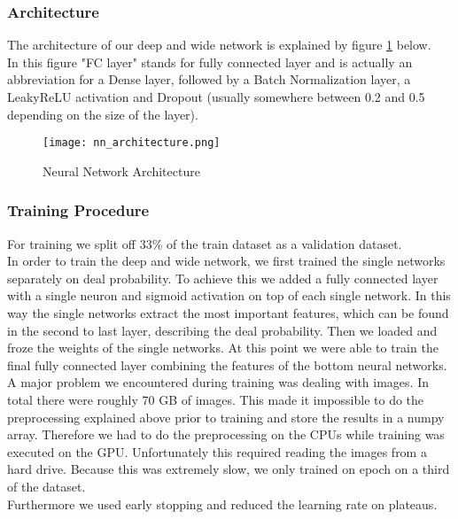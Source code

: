 \documentclass[runningheads]{llncs}
\begin{document}
 \subsubsection{Architecture}
The architecture of our deep and wide network is explained by figure \ref{fig:architecture} below.\\
In this figure "FC layer" stands for fully connected layer and is actually an abbreviation for a Dense layer, followed by a Batch Normalization layer, a LeakyReLU activation and Dropout (usually somewhere between 0.2 and 0.5 depending on the size of the layer).
 
\begin{figure}
	\centering
	\texttt{[image: nn\_architecture.png]}
	\caption[]{Neural Network Architecture}
	\label{fig:architecture}
\end{figure}

 \subsubsection{Training Procedure}
 For training we split off 33\% of the train dataset as a validation dataset.\\
In order to train the deep and wide network, we first trained the single networks separately on deal probability. To achieve this we added a fully connected layer with a single neuron and sigmoid activation on top of each single network. In this way the single networks extract the most important features, which can be found in the second to last layer, describing the deal probability. Then we loaded and froze the weights of the single networks. At this point we were able to train the final fully connected layer combining the features of the bottom neural networks.\\
A major problem we encountered during training was dealing with images. In total there were roughly 70 GB of images. This made it impossible to do the preprocessing explained above prior to training and store the results in a numpy array. Therefore we had to do the preprocessing on the CPUs while training was executed on the GPU. Unfortunately this required reading the images from a hard drive. Because this was extremely slow, we only trained on epoch on a third of the dataset.\\
Furthermore we used early stopping and reduced the learning rate on plateaus.
\end{document}
